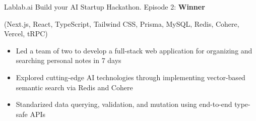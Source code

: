 \documentclass[
  a4paper,
  10pt,
  dvipdfmx
]{article}
\begin{document}
\begin{enumerate}[]
        Lablab.ai Build your AI Startup Hackathon. Episode 2: \textbf{Winner}

        (Next.js, React, TypeScript, Tailwind CSS, Prisma, MySQL, Redis, Cohere, Vercel, tRPC)

        \begin{itemize}
          \item Led a team of two to develop a full-stack web application for organizing and searching personal notes in 7 days
          \item Explored cutting-edge AI technologies through implementing vector-based semantic search via Redis and Cohere
          \item Standarized data querying, validation, and mutation using end-to-end type-safe APIs
        \end{itemize}



\end{enumerate}
\end{document}
